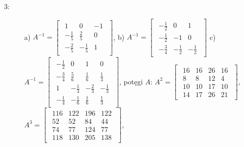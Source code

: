 \documentclass{article}
\begin{document}
\begin{description}
    \item [3:] a) $A^{-1} = \begin{bmatrix}\begin{array}{rrr} 1 & 0 & -1\\ -\frac{1}{5} & \frac{2}{5} & 0\\ -\frac{2}{5} & -\frac{1}{5} & 1 \end{array}\end{bmatrix}$,
    b) $A^{-1} = \begin{bmatrix}\begin{array}{rrr} -\frac{1}{2} & 0 & 1\\ -\frac{1}{2} & -1 & 0\\ -\frac{3}{4} & -\frac{1}{2} & -\frac{1}{2} \end{array}\end{bmatrix}$
    c) $A^{-1} = \begin{bmatrix}\begin{array}{rrrr} -\frac{1}{2} & 0 & 1 & 0\\ -\frac{3}{4} & \frac{5}{6} & \frac{1}{6} & \frac{1}{3}\\ 1 & -\frac{1}{3} & -\frac{2}{3} & -\frac{1}{3}\\ -\frac{1}{4} & -\frac{1}{6} & \frac{1}{6} & \frac{1}{3} \end{array}\end{bmatrix}$, potęgi $A$: $A^{2} = \begin{bmatrix}\begin{array}{rrrr} 16 & 16 & 26 & 16\\ 8 & 8 & 12 & 4\\ 10 & 10 & 17 & 10\\ 14 & 17 & 26 & 21 \end{array}\end{bmatrix}$, $A^{3} = \begin{bmatrix}\begin{array}{rrrr} 116 & 122 & 196 & 122\\ 52 & 52 & 84 & 44\\ 74 & 77 & 124 & 77\\ 118 & 130 & 205 & 138 \end{array}\end{bmatrix}$,

\end{description}
\end{document}
